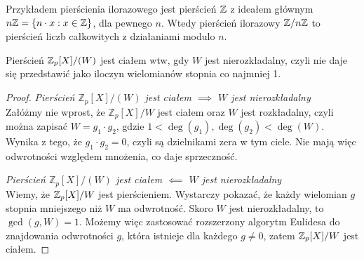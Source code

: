 Przykładem pierścienia ilorazowego jest pierścień \( \mathbb{Z} \) z ideałem głównym \( n \integer = \set{n \cdot x : x \in \integer} \), dla pewnego \( n \).
Wtedy pierścień ilorazowy \( \mathbb{Z} / n\mathbb{Z} \) to pierścień liczb całkowitych z działaniami modulo \( n \).
\begin{theorem}
Pierścień \( \mathbb{Z}_p[X]/(W) \) jest ciałem wtw, gdy \( W \) jest nierozkładalny, czyli nie daje się przedstawić jako iloczyn wielomianów stopnia co najmniej 1.
\end{theorem}
\begin{proof}
    \textit{Pierścień \( \mathbb{Z}_p[X]/(W) \) jest ciałem \( \implies \) \( W \) jest nierozkładalny} \\
    Załóżmy nie wprost, że \( \mathbb{Z}_p[X]/W \) jest ciałem oraz \( W \) jest rozkładalny, czyli można zapisać \linebreak \( W = g_1 \cdot g_2 \), gdzie \( 1 < \deg(g_1), \deg(g_2) < \deg(W) \).
    Wynika z tego, że \( g_1 \cdot g_2 = 0 \), czyli są dzielnikami zera w tym ciele. Nie mają więc odwrotności względem mnożenia, co daje sprzeczność.

    \textit{Pierścień \( \mathbb{Z}_p[X]/(W) \) jest ciałem \( \impliedby \) \( W \) jest nierozkładalny} \\
    Wiemy, że \( \mathbb{Z}_p[X]/W \) jest pierścieniem. Wystarczy pokazać, że każdy wielomian \( g \) stopnia mniejszego niż \( W \) ma odwrotność.
    Skoro \( W \) jest nierozkładalny, to \( \gcd(g, W) = 1 \). Możemy więc zastosować rozszerzony algorytm Eulidesa do znajdowania odwrotności \( g \), która istnieje dla każdego \( g \neq 0 \), zatem \( \mathbb{Z}_p[X]/W \) jest ciałem.
\end{proof}